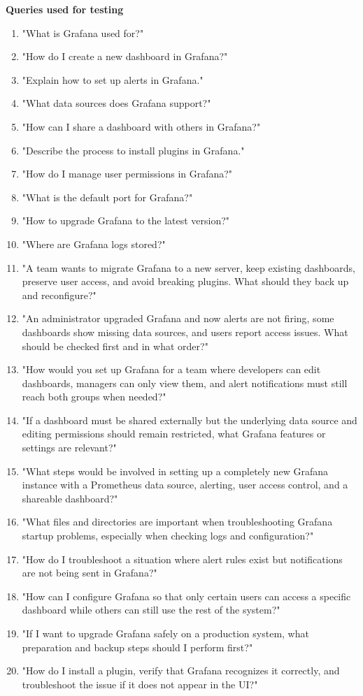 \documentclass[fleqn,moreauthors,10pt]{ds_report}
\begin{document}
\textbf{Queries used for testing}
\begin{enumerate}
    \item "What is Grafana used for?"
    \item "How do I create a new dashboard in Grafana?"
    \item "Explain how to set up alerts in Grafana."
    \item "What data sources does Grafana support?"
    \item "How can I share a dashboard with others in Grafana?"
    \item "Describe the process to install plugins in Grafana."
    \item "How do I manage user permissions in Grafana?"
    \item "What is the default port for Grafana?"
    \item "How to upgrade Grafana to the latest version?"
    \item "Where are Grafana logs stored?"
    \item"A team wants to migrate Grafana to a new server, keep existing dashboards, preserve user access, and avoid breaking plugins. What should they back up and reconfigure?"
    \item"An administrator upgraded Grafana and now alerts are not firing, some dashboards show missing data sources, and users report access issues. What should be checked first and in what order?"
    \item"How would you set up Grafana for a team where developers can edit dashboards, managers can only view them, and alert notifications must still reach both groups when needed?"
    \item"If a dashboard must be shared externally but the underlying data source and editing permissions should remain restricted, what Grafana features or settings are relevant?"
    \item"What steps would be involved in setting up a completely new Grafana instance with a Prometheus data source, alerting, user access control, and a shareable dashboard?"
    \item"What files and directories are important when troubleshooting Grafana startup problems, especially when checking logs and configuration?"
    \item"How do I troubleshoot a situation where alert rules exist but notifications are not being sent in Grafana?"
    \item"How can I configure Grafana so that only certain users can access a specific dashboard while others can still use the rest of the system?"
    \item"If I want to upgrade Grafana safely on a production system, what preparation and backup steps should I perform first?"
    \item"How do I install a plugin, verify that Grafana recognizes it correctly, and troubleshoot the issue if it does not appear in the UI?"
\end{enumerate}
\end{document}
